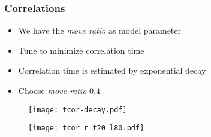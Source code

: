 \begin{frame}
    \frametitle{Correlations}
    \begin{itemize}
        \item We have the \emph{move ratio} as model parameter
        \item Tune to minimize correlation time
        \item Correlation time is estimated by exponential decay
        \item Choose \emph{move ratio} $0.4$
    \end{itemize}
    \begin{figure}[b]
        \centering
        \begin{minipage}{0.49\linewidth}
            \centering
            \texttt{[image: tcor-decay.pdf]}
        \end{minipage}
        \hfill
        \begin{minipage}{0.49\linewidth}
            \centering
            \texttt{[image: tcor\_r\_t20\_l80.pdf]}
        \end{minipage}
    \end{figure}   
\end{frame}

